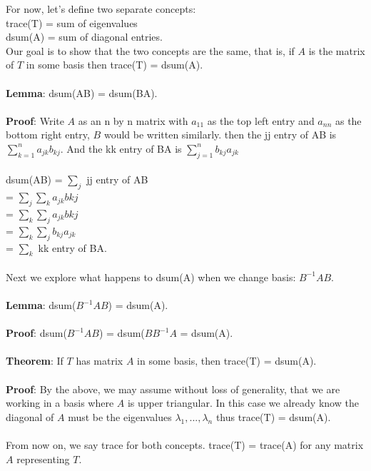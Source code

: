 \documentclass{article}
\begin{document}
For now, let's define two separate concepts: \\ 
trace(T) = sum of eigenvalues \\
dsum(A) = sum of diagonal entries. \\
Our goal is to show that the two concepts are the same, that is, if $A$ is the matrix of $T$ in some basis then trace(T) = dsum(A). \\\\
\textbf{Lemma}: dsum(AB) = dsum(BA). \\\\
\textbf{Proof}: Write $A$ as an n by n matrix with $a_{11}$ as the top left entry and $a_{nn}$ as the bottom right entry, $B$ would be written similarly.  then the jj entry of AB is $\sum_{k=1}^{n} a_{jk} b_{kj}$. And the kk entry of BA is $\sum_{j=1}^{n} b_{kj} a_{jk}$\\\\
dsum(AB) = $\sum_{j}$ jj entry of AB \\ = $\sum_{j} \sum_{k} a_{jk} b{kj}$ \\ = $\sum_{k} \sum_{j} a_{jk} b{kj}$ \\ = $\sum_{k} \sum_{j} b_{kj} a_{jk}$\\ = $\sum_{k}$ kk entry of BA. \\\\ 
Next we explore what happens to dsum(A) when we change basis: $B^{-1}AB$. \\\\
\textbf{Lemma}: dsum($B^{-1}AB$) = dsum(A). \\\\
\textbf{Proof}: dsum($B^{-1}AB$) = dsum($BB^{-1}A$ = dsum(A). \\\\
\textbf{Theorem}: If $T$ has matrix $A$ in some basis, then trace(T) = dsum(A). \\\\
\textbf{Proof}: By the above, we may assume without loss of generality, that we are working in a basis where $A$ is upper triangular. In this case we already know the diagonal of $A$ must be the eigenvalues $\lambda_1, ..., \lambda_n$ thus trace(T) = dsum(A). \\\\
From now on, we say trace for both concepts. trace(T) = trace(A) for any matrix $A$ representing $T$. 
\end{document}
